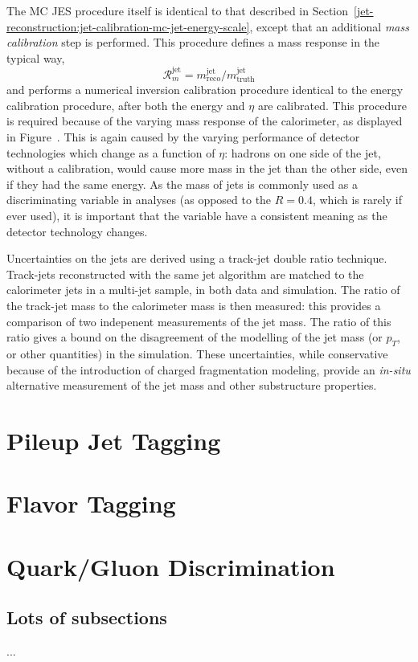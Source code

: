 The MC JES procedure itself is identical to that described in Section~\ref{jet-reconstruction:jet-calibration-mc-jet-energy-scale}, except that an additional \textit{mass calibration} step is performed. This procedure defines a mass response in the typical way,
%
\begin{equation}
\mathcal{R}^{\mathrm{jet}}_m = m^{\mathrm{jet}}_{\mathrm{reco}} /  m^{\mathrm{jet}}_{\mathrm{truth}} 
\end{equation}
%
and performs a numerical inversion calibration procedure identical to the energy calibration procedure, after both the energy and $\eta$ are calibrated. This procedure is required because of the varying mass response of the calorimeter, as displayed in Figure~. This is again caused by the varying performance of detector technologies which change as a function of $\eta$: hadrons on one side of the jet, without a calibration, would cause more mass in the jet than the other side, even if they had the same energy. As the mass of \largeR jets is commonly used as a discriminating variable in analyses (as opposed to the $R=0.4$, which is rarely if ever used), it is important that the variable have a consistent meaning as the detector technology changes.

Uncertainties on the \largeR jets are derived using a track-jet double ratio technique. Track-jets reconstructed with the same jet algorithm are matched to the calorimeter jets in a multi-jet sample, in both data and simulation. The ratio of the track-jet mass to the calorimeter mass is then measured: this provides a comparison of two indepenent measurements of the jet mass. The ratio of this ratio gives a bound on the disagreement of the modelling of the jet mass (or $p_T$, or other quantities) in the simulation.  These uncertainties, while conservative because of the introduction of charged fragmentation modeling, provide an \textit{in-situ} alternative measurement of the jet mass and other substructure properties. 

\section{Pileup Jet Tagging}
\label{jet-reconstruction:pileup-jet-tagging}

\section{Flavor Tagging}

\section{Quark/Gluon Discrimination}
	\subsection{Lots of subsections}
		...